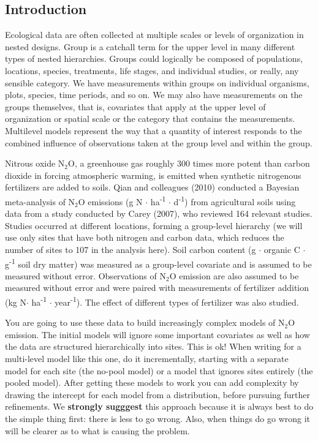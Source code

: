 \documentclass[
]{article}
\begin{document}
\hypertarget{introduction}{%
\subsection{Introduction}\label{introduction}}

Ecological data are often collected at multiple scales or levels of
organization in nested designs. Group is a catchall term for the upper
level in many different types of nested hierarchies. Groups could
logically be composed of populations, locations, species, treatments,
life stages, and individual studies, or really, any sensible category.
We have measurements within groups on individual organisms, plots,
species, time periods, and so on. We may also have measurements on the
groups themselves, that is, covariates that apply at the upper level of
organization or spatial scale or the category that contains the
measurements. Multilevel models represent the way that a quantity of
interest responds to the combined influence of observations taken at the
group level and within the group.

Nitrous oxide \(\textrm{N} _2 \textrm{O}\), a greenhouse gas roughly 300
times more potent than carbon dioxide in forcing atmospheric warming, is
emitted when synthetic nitrogenous fertilizers are added to soils. Qian
and colleagues (2010) conducted a Bayesian meta-analysis of
\(\textrm{N} _2 \textrm{O}\) emissions (g N \(\cdot\)
ha\textsuperscript{-1} \(\cdot\) d\textsuperscript{-1}) from
agricultural soils using data from a study conducted by Carey (2007),
who reviewed 164 relevant studies. Studies occurred at different
locations, forming a group-level hierarchy (we will use only sites that
have both nitrogen and carbon data, which reduces the number of sites to
107 in the analysis here). Soil carbon content (g \(\cdot\) organic C
\(\cdot\) g\textsuperscript{-1} soil dry matter) was measured as a
group-level covariate and is assumed to be measured without error.
Observations of \(\textrm{N} _2 \textrm{O}\) emission are also assumed
to be measured without error and were paired with measurements of
fertilizer addition (kg N\(\cdot\) ha\textsuperscript{-1} \(\cdot\)
year\textsuperscript{-1}). The effect of different types of fertilizer
was also studied.

You are going to use these data to build increasingly complex models of
\(\textrm{N} _2 \textrm{O}\) emission. The initial models will ignore
some important covariates as well as how the data are structured
hierarchically into sites. This is ok! When writing for a multi-level
model like this one, do it incrementally, starting with a separate model
for each site (the no-pool model) or a model that ignores sites entirely
(the pooled model). After getting these models to work you can add
complexity by drawing the intercept for each model from a distribution,
before pursuing further refinements. We \textbf{strongly sugggest} this
approach because it is always best to do the simple thing first: there
is less to go wrong. Also, when things do go wrong it will be clearer as
to what is causing the problem.
\end{document}
